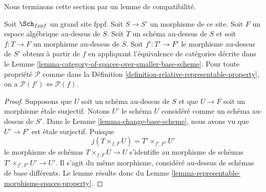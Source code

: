 \noindent
Nous terminons cette section par un lemme de compatibilité.

\begin{lemma}
\label{lemma-viewed-as-properties}
Soit $\Sch_{fppf}$ un grand site fppf.
Soit $S \to S'$ un morphisme de ce site.
Soit $F$ un espace algébrique au-dessus de $S$.
Soit $T$ un schéma au-dessus de $S$ et soit $f : T \to F$
un morphisme au-dessus de $S$.
Soit $f' : T' \to F'$ le morphisme au-dessus de $S'$ obtenu à partir de
$f$ en appliquant l'équivalence de catégories décrite dans le
Lemme \ref{lemma-category-of-spaces-over-smaller-base-scheme}.
Pour toute propriété $\mathcal{P}$ comme dans la
Définition \ref{definition-relative-representable-property},
on a $\mathcal{P}(f') \Leftrightarrow \mathcal{P}(f)$.
\end{lemma}

\begin{proof}
Supposons que $U$ soit un schéma au-dessus de $S$ et que $U \to F$ soit un
morphisme \'etale surjectif. Notons $U'$ le schéma $U$ considéré comme un schéma au-dessus de $S'$. Dans le
Lemme \ref{lemma-change-base-scheme},
nous avons vu que $U' \to F'$ est \'etale surjectif. Puisque
$$
j(T \times_{f, F} U) = T' \times_{f', F'} U'
$$
le morphisme de schémas $T \times_{f, F} U \to U$
s'identifie au morphisme de schémas
$T' \times_{f', F'} U' \to U'$.
Il s'agit du même morphisme, considéré au-dessus de schémas de base différents.
Le lemme résulte donc du
Lemme \ref{lemma-representable-morphisms-spaces-property}.
\end{proof}
















